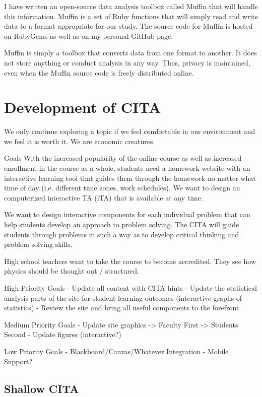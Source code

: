 I have written an open-source data analysis toolbox called Muffin that will handle this information. Muffin is a set of Ruby functions that will simply read and write data to a format appropriate for our study. The source code for Muffin is hosted on RubyGems as well as on my personal GitHub page.

Muffin is simply a toolbox that converts data from one format to another. It does not store anything or conduct analysis in any way. Thus, privacy is maintained, even when the Muffin source code is freely distributed online.

\section{Development of CITA}

We only continue exploring a topic if we feel comfortable in our environment and we feel it is worth it. We are economic creatures.

Goals
With the increased popularity of the online course as well as increased enrollment in the course as a whole, students need a homework website with an interactive learning tool that guides them through the homework no matter what time of day (i.e. different time zones, work schedules).  We want to design an computerized interactive TA (iTA) that is available at any time.

We want to design interactive components for each individual problem that can help students develop an approach to problem solving.  The CITA will guide students through problems in such a way as to develop critical thinking and problem solving skills.

High school teachers want to take the course to become accredited.  They see how physics should be thought out / structured.

High Priority Goals
- Update all content with CITA hints
- Update the statistical analysis parts of the site for student learning outcomes (interactive graphs of statistics)
- Review the site and bring all useful components to the forefront

Medium Priority Goals
- Update site graphics
-> Faculty First
-> Students Second
- Update figures (interactive?)

Low Priority Goals
- Blackboard/Canvas/Whatever Integration
- Mobile Support?

\subsection{Shallow CITA}

